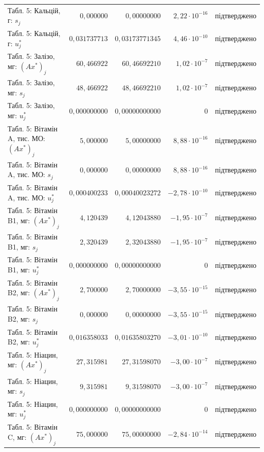 {\begin{longtable}{>{\raggedright}p{4.3cm}rrr>{\raggedright\arraybackslash}p{2.3cm}}
Табл. 5: Кальцій, г: $s_j$ & $0{,}000000$ & $0{,}00000000$ & $2{,}22\cdot10^{-16}$ & підтверджено \\
Табл. 5: Кальцій, г: $u_j^*$ & $0{,}031737713$ & $0{,}03173771345$ & $4{,}46\cdot10^{-10}$ & підтверджено \\
Табл. 5: Залізо, мг: $(Ax^*)_j$ & $60{,}466922$ & $60{,}46692210$ & $1{,}02\cdot10^{-7}$ & підтверджено \\
Табл. 5: Залізо, мг: $s_j$ & $48{,}466922$ & $48{,}46692210$ & $1{,}02\cdot10^{-7}$ & підтверджено \\
Табл. 5: Залізо, мг: $u_j^*$ & $0{,}000000000$ & $0{,}00000000000$ & $0$ & підтверджено \\
Табл. 5: Вітамін A, тис. МО: $(Ax^*)_j$ & $5{,}000000$ & $5{,}00000000$ & $8{,}88\cdot10^{-16}$ & підтверджено \\
Табл. 5: Вітамін A, тис. МО: $s_j$ & $0{,}000000$ & $0{,}00000000$ & $8{,}88\cdot10^{-16}$ & підтверджено \\
Табл. 5: Вітамін A, тис. МО: $u_j^*$ & $0{,}000400233$ & $0{,}00040023272$ & $-2{,}78\cdot10^{-10}$ & підтверджено \\
Табл. 5: Вітамін B1, мг: $(Ax^*)_j$ & $4{,}120439$ & $4{,}12043880$ & $-1{,}95\cdot10^{-7}$ & підтверджено \\
Табл. 5: Вітамін B1, мг: $s_j$ & $2{,}320439$ & $2{,}32043880$ & $-1{,}95\cdot10^{-7}$ & підтверджено \\
Табл. 5: Вітамін B1, мг: $u_j^*$ & $0{,}000000000$ & $0{,}00000000000$ & $0$ & підтверджено \\
Табл. 5: Вітамін B2, мг: $(Ax^*)_j$ & $2{,}700000$ & $2{,}70000000$ & $-3{,}55\cdot10^{-15}$ & підтверджено \\
Табл. 5: Вітамін B2, мг: $s_j$ & $0{,}000000$ & $0{,}00000000$ & $-3{,}55\cdot10^{-15}$ & підтверджено \\
Табл. 5: Вітамін B2, мг: $u_j^*$ & $0{,}016358033$ & $0{,}01635803270$ & $-3{,}01\cdot10^{-10}$ & підтверджено \\
Табл. 5: Ніацин, мг: $(Ax^*)_j$ & $27{,}315981$ & $27{,}31598070$ & $-3{,}00\cdot10^{-7}$ & підтверджено \\
Табл. 5: Ніацин, мг: $s_j$ & $9{,}315981$ & $9{,}31598070$ & $-3{,}00\cdot10^{-7}$ & підтверджено \\
Табл. 5: Ніацин, мг: $u_j^*$ & $0{,}000000000$ & $0{,}00000000000$ & $0$ & підтверджено \\
Табл. 5: Вітамін C, мг: $(Ax^*)_j$ & $75{,}000000$ & $75{,}00000000$ & $-2{,}84\cdot10^{-14}$ & підтверджено \\

\end{longtable}}
